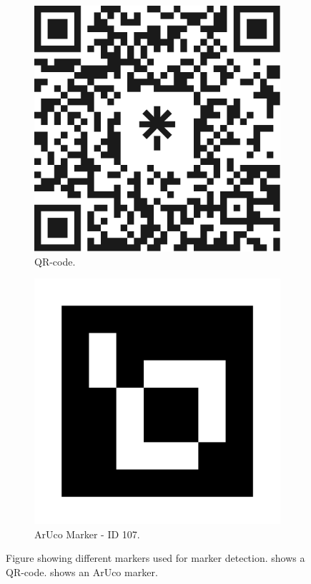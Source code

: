 \documentclass{l4proj}
\begin{document}
\begin{figure}[!ht]
    \centering
    \begin{subfigure}{0.30\textwidth}
        \centering
        \includegraphics[width=\textwidth]{images/qr-code.png}
        \caption{QR-code.}
        \label{fig:qr-code}  
    \end{subfigure}
    \begin{subfigure}{0.32\textwidth}
        \centering
        \includegraphics[width=\textwidth]{images/ARUCO_ID107 - Robot.png}
        \caption{ArUco Marker - ID 107.}
        \label{fig:aruco-marker}  
    \end{subfigure}
    \caption{Figure showing different markers used for marker detection.  shows a QR-code.  shows an ArUco marker.}
    \label{fig:markers}
\end{figure}
\end{document}
